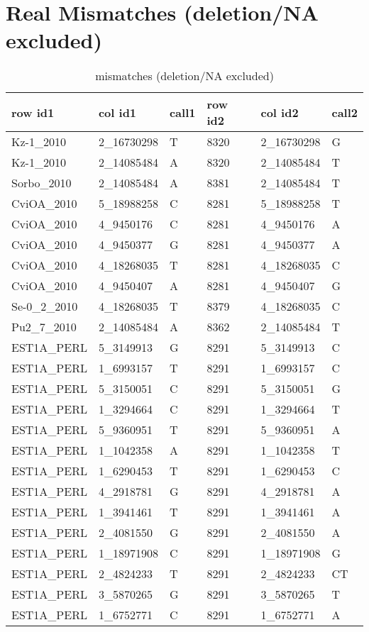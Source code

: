 \section{Real Mismatches (deletion/NA excluded)} \label{section_real_mismatch}
\begin{center}
\begin{longtable}{|l|l|l|l|l|l|}
\caption{mismatches (deletion/NA excluded)} \label{table_dm1}\\
\hline
row id1&col id1&call1&row id2&col id2&call2\\
\hline
Kz-1\_2010&2\_16730298&T&8320&2\_16730298&G\\
Kz-1\_2010&2\_14085484&A&8320&2\_14085484&T\\
Sorbo\_2010&2\_14085484&A&8381&2\_14085484&T\\
CviOA\_2010&5\_18988258&C&8281&5\_18988258&T\\
CviOA\_2010&4\_9450176&C&8281&4\_9450176&A\\
CviOA\_2010&4\_9450377&G&8281&4\_9450377&A\\
CviOA\_2010&4\_18268035&T&8281&4\_18268035&C\\
CviOA\_2010&4\_9450407&A&8281&4\_9450407&G\\
Se-0\_2\_2010&4\_18268035&T&8379&4\_18268035&C\\
Pu2\_7\_2010&2\_14085484&A&8362&2\_14085484&T\\
EST1A\_PERL&5\_3149913&G&8291&5\_3149913&C\\
EST1A\_PERL&1\_6993157&T&8291&1\_6993157&C\\
EST1A\_PERL&5\_3150051&C&8291&5\_3150051&G\\
EST1A\_PERL&1\_3294664&C&8291&1\_3294664&T\\
EST1A\_PERL&5\_9360951&T&8291&5\_9360951&A\\
EST1A\_PERL&1\_1042358&A&8291&1\_1042358&T\\
EST1A\_PERL&1\_6290453&T&8291&1\_6290453&C\\
EST1A\_PERL&4\_2918781&G&8291&4\_2918781&A\\
EST1A\_PERL&1\_3941461&T&8291&1\_3941461&A\\
EST1A\_PERL&2\_4081550&G&8291&2\_4081550&A\\
EST1A\_PERL&1\_18971908&C&8291&1\_18971908&G\\
EST1A\_PERL&2\_4824233&T&8291&2\_4824233&CT\\
EST1A\_PERL&3\_5870265&G&8291&3\_5870265&T\\
EST1A\_PERL&1\_6752771&C&8291&1\_6752771&A\\

\end{longtable}
\end{center}

